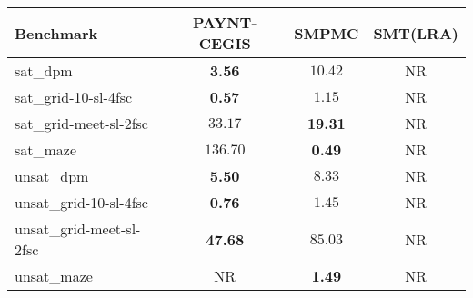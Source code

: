 \begin{tabular}{lccc}
\toprule
Benchmark & PAYNT-CEGIS & SMPMC & SMT(LRA) \\
\midrule
sat\_dpm & \textbf{3.56} & $10.42$ & NR \\
sat\_grid-10-sl-4fsc & \textbf{0.57} & $1.15$ & NR \\
sat\_grid-meet-sl-2fsc & $33.17$ & \textbf{19.31} & NR \\
sat\_maze & $136.70$ & \textbf{0.49} & NR \\
unsat\_dpm & \textbf{5.50} & $8.33$ & NR \\
unsat\_grid-10-sl-4fsc & \textbf{0.76} & $1.45$ & NR \\
unsat\_grid-meet-sl-2fsc & \textbf{47.68} & $85.03$ & NR \\
unsat\_maze & NR & \textbf{1.49} & NR \\
\bottomrule
\end{tabular}
